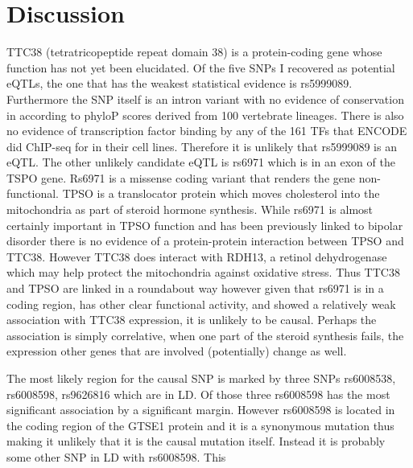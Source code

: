\documentclass[12pt,a4paper]{article}
\begin{document}
\section{Discussion}
     TTC38 (tetratricopeptide repeat domain 38) is a protein-coding gene whose function has not yet been elucidated. Of the five SNPs I recovered as potential eQTLs, the one that has the weakest statistical evidence is rs5999089. Furthermore the SNP itself is an intron variant with no evidence of conservation in according to phyloP scores derived from 100 vertebrate lineages. There is also no evidence of transcription factor binding by any of the 161 TFs that ENCODE did ChIP-seq for in their cell lines. Therefore it is unlikely that rs5999089 is an eQTL. The other unlikely candidate eQTL is rs6971 which is in an exon of the TSPO gene. Rs6971 is a missense coding variant that renders the gene non-functional. TPSO is a translocator protein which moves cholesterol into the mitochondria as part of steroid hormone synthesis. While rs6971 is almost certainly important in TPSO function and has been previously linked to bipolar disorder there is no evidence of a protein-protein interaction between TPSO and TTC38. However TTC38 does interact with RDH13, a retinol dehydrogenase which may help protect the mitochondria against oxidative stress. Thus TTC38 and TPSO are linked in a roundabout way however given that rs6971 is in a coding region, has other clear functional activity, and showed a relatively weak association with TTC38 expression, it is unlikely to be causal. Perhaps the association is simply correlative, when one part of the steroid synthesis fails, the expression other genes that are involved (potentially) change as well.
     
     The most likely region for the causal SNP is marked by three SNPs rs6008538, rs6008598, rs9626816 which are in LD. Of those three rs6008598 has the most significant association by a significant margin. However rs6008598 is located in the coding region of the GTSE1 protein and it is a synonymous mutation thus making it unlikely that it is the causal mutation itself. Instead it is probably some other SNP in LD with rs6008598. This             
\end{document}
